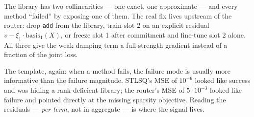 The library has two collinearities --- one exact, one approximate ---
and every method ``failed'' by exposing one of them. The real fix
lives upstream of the router: drop \texttt{add} from the library, train
slot 2 on an explicit residual
$\dot{v} - \xi_1 \cdot \mathrm{basis}_1(X)$, or freeze slot 1 after
commitment and fine-tune slot 2 alone. All three give the weak damping
term a full-strength gradient instead of a fraction of the joint loss.

The template, again: when a method fails, the failure mode is usually
more informative than the failure magnitude. STLSQ's MSE of $10^{-6}$
looked like success and was hiding a rank-deficient library; the
router's MSE of $5\cdot 10^{-3}$ looked like failure and pointed
directly at the missing sparsity objective. Reading the residuals ---
\emph{per term}, not in aggregate --- is where the signal lives.
